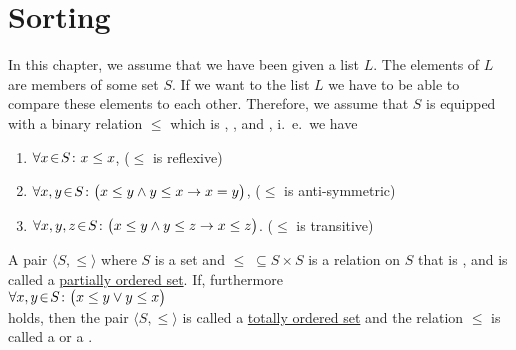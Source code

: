 \chapter{Sorting}
In this chapter, we assume that we have been given a list $L$.  The elements of $L$ are members of
some set $S$.  If we want to  the list $L$ we have to be able to compare these elements
to each other.   Therefore, we assume that $S$ is equipped with a binary relation $\leq$ which is
, , and
, i.~e.~we have   
\begin{enumerate}
\item $\forall x \!\in\! S \colon x \leq x$,                      \hspace*{\fill} ($\leq$ is reflexive)
\item $\forall x, y \!\in\! S \colon \bigl(x \leq y \wedge y \leq x
  \rightarrow x = y\bigr)$,   \hspace*{\fill} ($\leq$ is anti-symmetric)
\item $\forall x, y, z \!\in\! S \colon \bigl(x \leq y \wedge y \leq z \rightarrow x \leq z\bigr)$.  \hspace*{\fill} ($\leq$ is transitive)
\end{enumerate}
\begin{Definition} 
  A pair $\langle S, \leq \rangle$ where $S$ is a set and $\leq \;\subseteq S \times S$ is a relation
  on $S$ that is ,  and  is called a
  \href{http://en.wikipedia.org/wiki/Partially_ordered_set}{partially ordered set}.  
  If, furthermore
  \\[0.2cm]
  \hspace*{1.3cm}
  $\forall x, y \!\in\! S \colon\bigl( x \leq y \vee y \leq x\bigr)$
  \\[0.2cm]
  holds, then the pair $\langle S, \leq \rangle$ is called a 
  \href{http://en.wikipedia.org/wiki/Totally_ordered_set}{totally ordered set} and
  the relation $\leq$ is called a  or a . \eox
\end{Definition}

